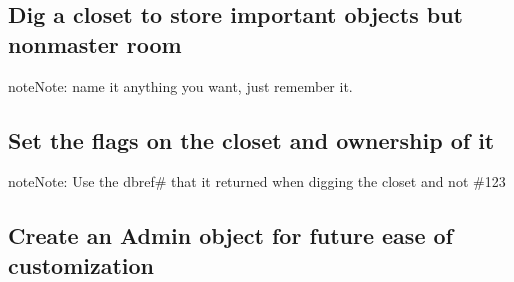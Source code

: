 \documentclass[letterpaper,10pt,english]{sphinxmanual}
\begin{document}
\begin{sphinxVerbatim}[commandchars=\\\{\}]
  
\end{sphinxVerbatim}


\subsection{Dig a closet to store important objects but non\sphinxhyphen{}master room}
\label{\detokenize{gettingstarted:dig-a-closet-to-store-important-objects-but-non-master-room}}
\begin{sphinxadmonition}{note}{Note:}
\sphinxAtStartPar
name it anything you want, just remember it.
\end{sphinxadmonition}

\begin{sphinxVerbatim}[commandchars=\\\{\}]
 
\end{sphinxVerbatim}


\subsection{Set the flags on the closet and ownership of it}
\label{\detokenize{gettingstarted:set-the-flags-on-the-closet-and-ownership-of-it}}
\begin{sphinxadmonition}{note}{Note:}
\sphinxAtStartPar
Use the dbref\# that it returned when digging the closet and not \#123
\end{sphinxadmonition}

\begin{sphinxVerbatim}[commandchars=\\\{\}]
 
 
\end{sphinxVerbatim}


\subsection{Create an Admin object for future ease of customization}
\label{\detokenize{gettingstarted:create-an-admin-object-for-future-ease-of-customization}}
\begin{sphinxVerbatim}[commandchars=\\\{\}]
 
\end{sphinxVerbatim}
\end{document}
